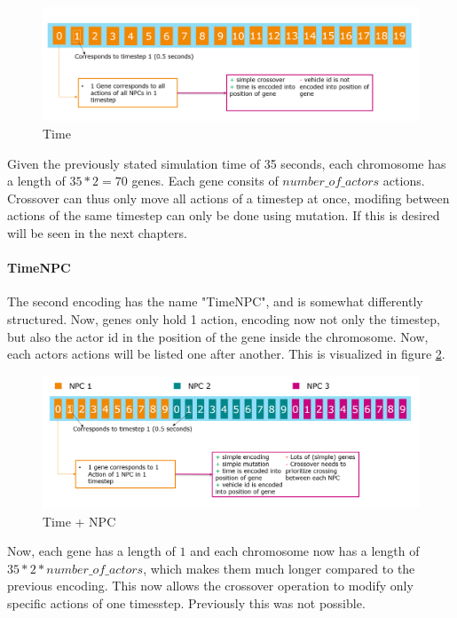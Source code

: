\begin{figure}[ht] 
	\includegraphics[width=1\linewidth]{figures/time_encoding}
	\caption{Time}
	\label{figure:encoding:chromosome:time}
\end{figure}


Given the previously stated simulation time of 35 seconds, each chromosome has a length of $35 * 2 = 70$ genes. Each gene consits of $number\_of\_actors$ actions.
Crossover can thus only move all actions of a timestep at once, modifing between actions of the same timestep can only be done using mutation. If this is desired will be seen in the next chapters.


\paragraph{TimeNPC}
The second encoding has the name "TimeNPC", and is somewhat differently structured. Now, genes only hold 1 action, encoding now not only the timestep, but also the actor id in the position of the gene inside the chromosome. Now, each actors actions will be listed one after another. This is visualized in figure \ref{figure:encoding:chromosome:time_npc}.

\begin{figure}[ht] 
	\includegraphics[width=1\linewidth]{figures/time_npc_encoding}
	\caption{Time + NPC}
	\label{figure:encoding:chromosome:time_npc}
\end{figure}

Now, each gene has a length of $1$ and each chromosome now has a length of $35 * 2 * number\_of\_actors$, which makes them much longer compared to the previous encoding. This now allows the crossover operation to modify only specific actions of one timesstep. Previously this was not possible.

